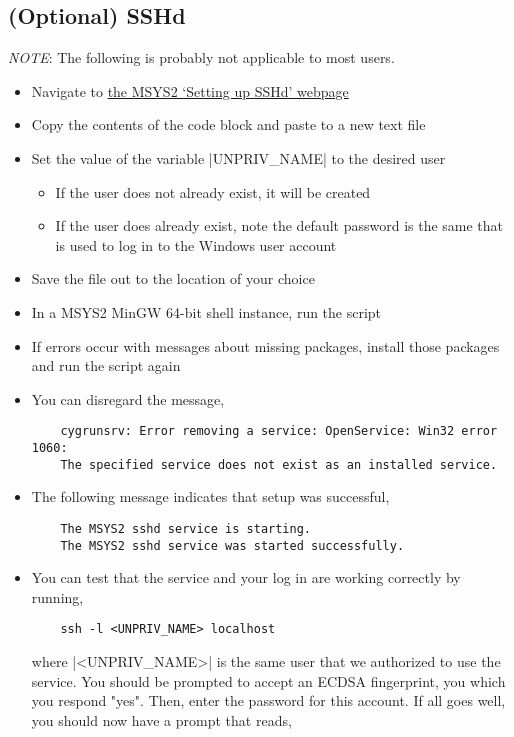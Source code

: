 \subsection{(Optional) SSHd}
\emph{NOTE}: The following is probably not applicable to most users.
\begin{itemize}
	\item Navigate to \href{https://www.msys2.org/wiki/Setting-up-SSHd}{the MSYS2 `Setting up SSHd' webpage}
	\item Copy the contents of the code block and paste to a new text file
	\item Set the value of the variable \lstinlinebg|UNPRIV_NAME| to the desired user
	\begin{itemize}
		\item If the user does not already exist, it will be created
		\item If the user does already exist, note the default password is the same that is used to log in to the Windows user account
	\end{itemize}
	\item Save the file out to the location of your choice
	\item In a MSYS2 MinGW 64-bit shell instance, run the script
	\item If errors occur with messages about missing packages, install those packages and run the script again
	\item You can disregard the message,

	\begin{lstlisting}
	cygrunsrv: Error removing a service: OpenService: Win32 error 1060:
	The specified service does not exist as an installed service.
	\end{lstlisting}

	\item The following message indicates that setup was successful, 

	\begin{lstlisting}
	The MSYS2 sshd service is starting.
	The MSYS2 sshd service was started successfully.
	\end{lstlisting}

	\item You can test that the service and your log in are working correctly by running, 

	\begin{lstlisting}
	ssh -l <UNPRIV_NAME> localhost
	\end{lstlisting}

	where \lstinlinebg|<UNPRIV_NAME>| is the same user that we authorized to use the service. You should be prompted to accept an ECDSA fingerprint, you which you respond "yes". Then, enter the password for this account. If all goes well, you should now have a prompt that reads, 


\end{itemize}
